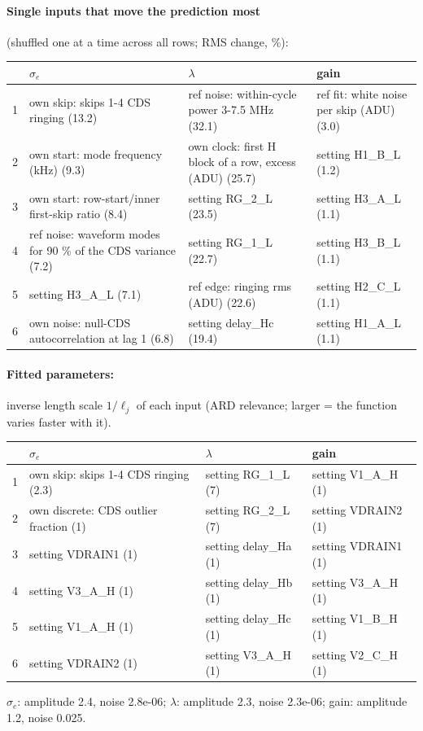 \paragraph{Single inputs that move the prediction most} (shuffled one at a time across all rows; RMS change, \%):
\begin{center}\footnotesize
\begin{tabular}{rp{}p{}p{}}
\toprule
 & $\sigma_e$ & $\lambda$ & gain \\
\midrule
1 & own skip: skips 1-4 CDS ringing (13.2) & ref noise: within-cycle power 3-7.5 MHz (32.1) & ref fit: white noise per skip (ADU) (3.0) \\
2 & own start: mode frequency (kHz) (9.3) & own clock: first H block of a row, excess (ADU) (25.7) & setting H1\_B\_L (1.2) \\
3 & own start: row-start/inner first-skip ratio (8.4) & setting RG\_2\_L (23.5) & setting H3\_A\_L (1.1) \\
4 & ref noise: waveform modes for 90 \% of the CDS variance (7.2) & setting RG\_1\_L (22.7) & setting H3\_B\_L (1.1) \\
5 & setting H3\_A\_L (7.1) & ref edge: ringing rms (ADU) (22.6) & setting H2\_C\_L (1.1) \\
6 & own noise: null-CDS autocorrelation at lag 1 (6.8) & setting delay\_Hc (19.4) & setting H1\_A\_L (1.1) \\
\bottomrule
\end{tabular}
\end{center}
\paragraph{Fitted parameters:} inverse length scale $1/\ell_j$ of each input (ARD relevance; larger = the function varies faster with it).
\begin{center}\footnotesize
\begin{tabular}{rp{}p{}p{}}
\toprule
 & $\sigma_e$ & $\lambda$ & gain \\
\midrule
1 & own skip: skips 1-4 CDS ringing (2.3) & setting RG\_1\_L (7) & setting V1\_A\_H (1) \\
2 & own discrete: CDS outlier fraction (1) & setting RG\_2\_L (7) & setting VDRAIN2 (1) \\
3 & setting VDRAIN1 (1) & setting delay\_Ha (1) & setting VDRAIN1 (1) \\
4 & setting V3\_A\_H (1) & setting delay\_Hb (1) & setting V3\_A\_H (1) \\
5 & setting V1\_A\_H (1) & setting delay\_Hc (1) & setting V1\_B\_H (1) \\
6 & setting VDRAIN2 (1) & setting V3\_A\_H (1) & setting V2\_C\_H (1) \\
\bottomrule
\end{tabular}
\end{center}
{\footnotesize $\sigma_e$: amplitude 2.4, noise 2.8e-06; $\lambda$: amplitude 2.3, noise 2.3e-06; gain: amplitude 1.2, noise 0.025.}
